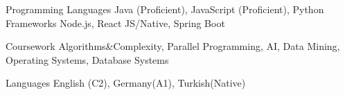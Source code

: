 

\begin{cvskills}

  \cvskill
    {Programming Languages} %
    {Java (Proficient), JavaScript (Proficient), Python} %
  \cvskill
    {Frameworks} %
    {Node.js, React JS/Native, Spring Boot } %

  \cvskill
  {Coursework}
  {Algorithms\&Complexity, Parallel Programming, AI, Data Mining, Operating Systems, Database Systems }

  \cvskill
    {Languages} %
    {English (C2), Germany(A1), Turkish(Native)} %

\end{cvskills}
